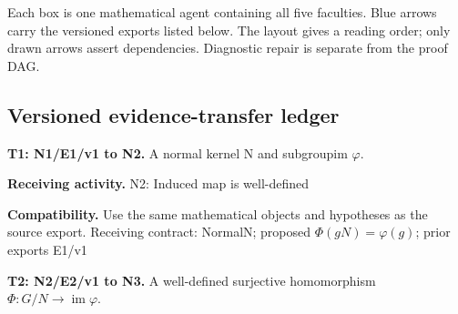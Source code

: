 \documentclass[preprint,12pt,aps,pra,showkeys,amsmath,amssymb,superscriptaddress,floatfix]{revtex4-2}
\theoremstyle{definition}
\theoremstyle{remark}
\newcommand{\field}[2]{\par\smallskip\noindent\textbf{#1.} #2\par}
\begin{document}
\begin{center}\end{center}

Each box is one mathematical agent containing all five faculties. Blue
arrows carry the versioned exports listed below. The layout gives a
reading order; only drawn arrows assert dependencies. Diagnostic repair
is separate from the proof DAG.

\subsection{Versioned evidence-transfer ledger}

\begingroup\small\linespread{1.05}\selectfont

\field{T1: N1/E1/v1 to N2}{A normal kernel N and subgroupim \(\varphi\).}

\field{Receiving activity}{N2: Induced map is well-defined}

\field{Compatibility}{Use the same mathematical objects and hypotheses as the source export.
Receiving contract: NormalN; proposed \(\Phi (gN)=\varphi (g)\); prior
exports E1/v1}

\field{T2: N2/E2/v1 to N3}{A well-defined surjective homomorphism
\(\Phi :G/N\to \operatorname{im} \varphi\).}
\end{document}
